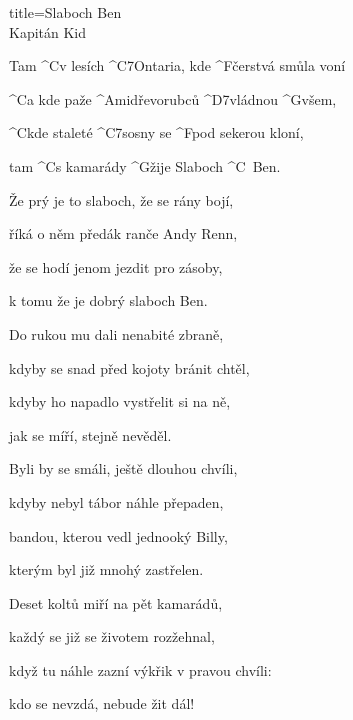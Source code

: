 \begin{song}{title=\predtitle\centering Slaboch Ben \\ Kapitán Kid\large  \vspace*{-0.3cm}}  %
\begin{centerjustified}

\sloka
	Tam ^{C}v lesích ^{{\z}C7}Ontaria, kde ^{F\z}čerstvá smůla voní

	^{C}a kde paže ^{Ami\z}dřevorubců ^{D7\z}vládnou ^{G\z}všem,
	
	^{C\z}kde staleté ^{C7\z}sosny se ^{F\z}pod sekerou kloní,
	
	tam ^{C}s kamarády ^{G\z}žije Slaboch ^{C\,\,\,}Ben.
	
	
\sloka
	Že prý je to slaboch, že se rány bojí,
	
	říká o něm předák ranče Andy Renn,
	
	že se hodí jenom jezdit pro zásoby,
	
	k tomu že je dobrý slaboch Ben.
	
	
\sloka
	Do rukou mu dali nenabité zbraně,
	
	kdyby se snad před kojoty bránit chtěl,
	
	kdyby ho napadlo vystřelit si na ně,
	
	jak se míří, stejně nevěděl.

	
\sloka	
	Byli by se smáli, ještě dlouhou chvíli,
	
	kdyby nebyl tábor náhle přepaden,
	
	bandou, kterou vedl jednooký Billy,
	
	kterým byl již mnohý zastřelen.
	
	

	


\sloka
	Deset koltů miří na pět kamarádů,
	
	každý se již se životem rozžehnal,
	
	když tu náhle zazní výkřik v pravou chvíli:
	
	kdo se nevzdá, nebude žit dál!
	

\end{centerjustified}
\end{song}
